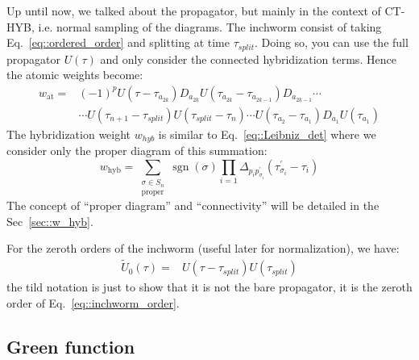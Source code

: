 \documentclass[10pt,letter]{article}
\begin{document}
Up until now, we talked about the propagator, but mainly in the context of CT-HYB, i.e. normal sampling of the diagrams. The inchworm consist of taking Eq.~\eqref{eq::ordered_order} and splitting at time $\tau_{split}$. Doing so, you can use the full propagator $U(\tau)$ and only consider the connected hybridization terms. Hence the atomic weights become:
\begin{align}
w_{\mathrm{at}} =&
(-1)^p
U(\tau-\tau_{a_{2k}}) D_{a_{2k}}
U(\tau_{a_{2k}}-\tau_{a_{2k-1}}) D_{a_{2k-1}}
\cdots   
\label{eq::ordered_order}
\nonumber
\\
&
\cdots 
U(\tau_{n+1}-\tau_{split}) 
U(\tau_{split}-\tau_{n})  
\cdots 
U(\tau_{a_2}-\tau_{a_1}) D_{a_1}
U(\tau_{a_{1}})
\end{align}
%
The hybridization weight $w_{hyb}$ is similar to Eq.~\eqref{eq::Leibniz_det} where we consider only the proper diagram of this summation:
\begin{equation}
w_\text{hyb} =
\sum_{\substack{\sigma \in S_n \\ \text{proper}}} \operatorname{sgn}(\sigma) 
\prod_{i=1} \Delta_{p_{i} p^\prime_{\sigma_i}}
(\tau_{\sigma_i}^{\prime} - \tau_{i})
\label{eq::w_hyb}
\end{equation}
%
The concept of ``proper diagram'' and ``connectivity'' will be detailed in the Sec~\ref{sec::w_hyb}. %
%

For the zeroth orders of the inchworm (useful later for normalization), we have:
\begin{align}
  \tilde U_0(\tau)=&
  U(\tau-\tau_{split}) 
  U(\tau_{split})  
  \label{eq::inchworm_order0}
\end{align}
%
the tild notation is just to show that it is not the bare propagator, it is the zeroth order of Eq.~\eqref{eq::inchworm_order}.


\subsection{Green function}
\end{document}
